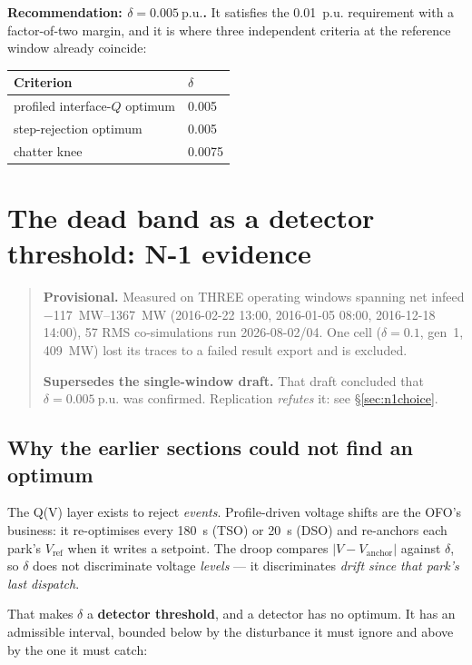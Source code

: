 \documentclass[11pt,a4paper]{article}
\newcommand{\pu}{\ensuremath{\mathrm{p.u.}}}
\newcommand{\dz}{\ensuremath{\delta}}
\begin{document}
\textbf{Recommendation: $\dz = \SI{0.005}{\pu}$.} It satisfies the
\SI{0.01}{\pu} requirement with a factor-of-two margin, and it is where three
independent criteria at the reference window already coincide:

\begin{center}
\begin{tabular}{ll}
\toprule
Criterion & $\dz$ \\
\midrule
profiled interface-$Q$ optimum & 0.005 \\
step-rejection optimum & 0.005 \\
chatter knee & 0.0075 \\
\bottomrule
\end{tabular}
\end{center}

\section{The dead band as a detector threshold: N-1 evidence}
\label{sec:n1}

\begin{quote}\small
\textbf{Provisional.} Measured on THREE operating windows spanning net infeed
\SIrange{-117}{+1367}{\mega\watt} (2016-02-22 13:00, 2016-01-05 08:00,
2016-12-18 14:00), 57 RMS co-simulations run 2026-08-02/04. One cell
($\dz=0.1$, gen~1, \SI{+409}{\mega\watt}) lost its traces to a failed result
export and is excluded.

\textbf{Supersedes the single-window draft.} That draft concluded that
$\dz=\SI{0.005}{\pu}$ was confirmed. Replication \emph{refutes} it: see
\S\ref{sec:n1choice}.
\end{quote}

\subsection{Why the earlier sections could not find an optimum}

The Q(V) layer exists to reject \emph{events}. Profile-driven voltage shifts are
the OFO's business: it re-optimises every \SI{180}{\second} (TSO) or
\SI{20}{\second} (DSO) and re-anchors each park's $V_\mathrm{ref}$ when it writes
a setpoint. The droop compares $|V-V_\mathrm{anchor}|$ against $\dz$, so $\dz$
does not discriminate voltage \emph{levels} --- it discriminates \emph{drift
since that park's last dispatch}.

That makes $\dz$ a \textbf{detector threshold}, and a detector has no optimum. It
has an admissible interval, bounded below by the disturbance it must ignore and
above by the one it must catch:
\end{document}
